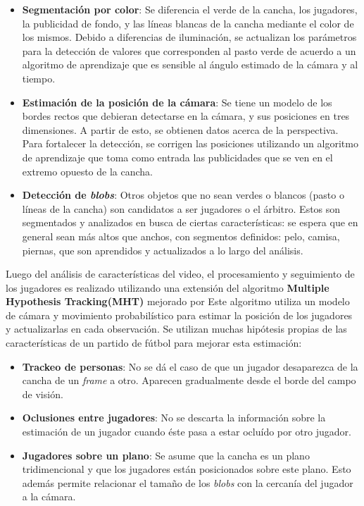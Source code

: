 \documentclass[a4paper,10pt]{article}
\begin{document}
\begin{itemize}
  \item \textbf{Segmentación por color}: Se diferencia el verde de la cancha, los jugadores, la publicidad de fondo,
  y las líneas blancas de la cancha mediante el color de los mismos. Debido a diferencias de
  iluminación, se actualizan los parámetros para la detección de valores que corresponden al pasto verde de acuerdo
  a un algoritmo de aprendizaje que es sensible al ángulo estimado de la cámara y al tiempo.
  \item \textbf{Estimación de la posición de la cámara}: Se tiene un modelo de los bordes rectos que debieran detectarse
  en la cámara, y sus posiciones en tres dimensiones. A partir de esto, se obtienen datos acerca de la perspectiva.
  Para fortalecer la detección, se
  corrigen las posiciones utilizando un algoritmo de aprendizaje que toma como entrada las publicidades que se ven en 
  el extremo opuesto de la cancha.
  \item \textbf{Detección de \textit{blobs}}: Otros objetos que no sean verdes o blancos (pasto o líneas de la cancha)
  son candidatos a ser jugadores o el árbitro. Estos son segmentados y analizados en busca de ciertas características:
  se espera que en general sean más altos que anchos, con segmentos definidos: pelo, camisa, piernas, que son
  aprendidos y actualizados a lo largo del análisis.
\end{itemize}

Luego del análisis de características del video, el procesamiento y seguimiento de los jugadores es realizado utilizando
una extensión del algoritmo \textbf{Multiple Hypothesis Tracking(MHT)} \cite{MHT-1, MHT-2} mejorado por \citeauthor*{Schmitt-1, Schmitt-2}
Este algoritmo utiliza un modelo de cámara y movimiento probabilístico para estimar la posición de los jugadores
y actualizarlas en cada observación. Se utilizan muchas hipótesis propias de las características de un partido
de fútbol para mejorar esta estimación: 
\begin{itemize}
  \item \textbf{Trackeo de personas}: No se dá el caso de que un jugador desaparezca de la cancha de un \textit{frame}
  a otro. Aparecen gradualmente desde el borde del campo de visión.
  \item \textbf{Oclusiones entre jugadores}: No se descarta la información sobre la estimación de un jugador cuando 
  éste pasa a estar ocluído por otro jugador.
  \item \textbf{Jugadores sobre un plano}: Se asume que la cancha es un plano tridimencional y que los jugadores
  están posicionados sobre este plano. Esto además permite relacionar el tamaño de los \textit{blobs} con la cercanía
  del jugador a la cámara.
\end{itemize}
\end{document}

